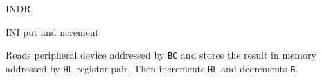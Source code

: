 \begin{basedescript}{
	\desclabelstyle{\multilinelabel}
	\desclabelwidth{3cm}}
\begin{DetailItem}{INDR}{}
	\end{DetailItem}

	\pagebreak


	\begin{DetailItem}{INI}{}
		{put and ncrement}
		{\SymINI}

		Reads peripheral device addressed by {\tt BC} and stores the result in memory addressed by {\tt HL} register pair. Then increments {\tt HL} and decrements {\tt B}.

		\begin{DetailEffects}
			\FlagsINI
		\end{DetailEffects}

		\begin{DetailEffectsFlags}
		\end{DetailEffectsFlags}

		\begin{DetailTiming}
		\end{DetailTiming}

	\end{DetailItem}



\end{basedescript}
